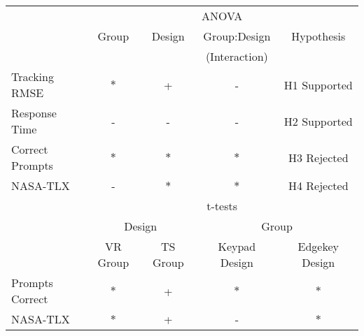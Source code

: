 \begin{tabular}{@{}lcccc@{}}
\toprule
                & \multicolumn{4}{c}{ANOVA} \\
                & Group & Design & Group:Design & Hypothesis\\
                & & & (Interaction) & \\
\midrule
Tracking RMSE   & $*$ &  +  &  -  & H1 Supported\\
Response Time   &  -  &  -  &  -  & H2 Supported\\
Correct Prompts & $*$ & $*$ & $*$ & H3 Rejected\\
NASA-TLX        &  -  & $*$ & $*$ & H4 Rejected\\
\midrule
                & \multicolumn{4}{c}{t-tests} \\
                & \multicolumn{2}{c}{Design} & \multicolumn{2}{c}{Group} \\
                & VR Group & TS Group  & Keypad Design & Edgekey Design \\
\midrule
Prompts Correct & $*$ & + & $*$ & $*$ \\
NASA-TLX        & $*$ & + &  -  & $*$ \\
\bottomrule
\end{tabular}
